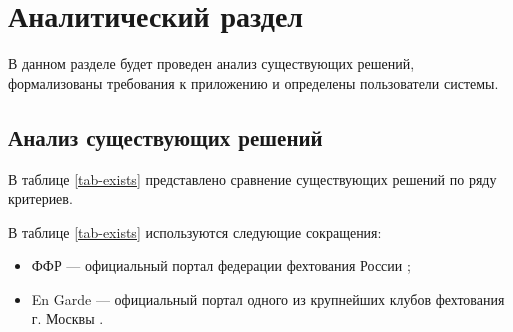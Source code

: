 \chapter{Аналитический раздел}\label{sec:analyth}

В данном разделе будет проведен анализ существующих решений, формализованы требования к приложению и определены пользователи системы.

%

\section{Анализ существующих решений}

В таблице \ref{tab-exists} представлено сравнение существующих решений по ряду критериев. 

В таблице \ref{tab-exists} используются следующие сокращения:

\begin{itemize}
	\item ФФР --- официальный портал федерации фехтования России \cite{FIE};
	\item En Garde --- официальный портал одного из крупнейших клубов фехтования г. Москвы \cite{EnGarde}.
\end{itemize}

\begin{table}[H]
	\centering
	\caption{Анализ существующих решений}
	\renewcommand{\arraystretch}{1.8}
\label{tab-exists}
\end{table}

